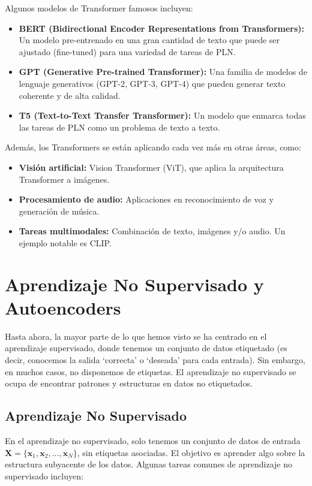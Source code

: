 \documentclass{article}
\begin{document}
Algunos modelos de Transformer famosos incluyen:

\begin{itemize}
    \item \textbf{BERT (Bidirectional Encoder Representations from Transformers):}  Un modelo pre-entrenado en una gran cantidad de texto que puede ser ajustado (fine-tuned) para una variedad de tareas de PLN.
    \item \textbf{GPT (Generative Pre-trained Transformer):}  Una familia de modelos de lenguaje generativos (GPT-2, GPT-3, GPT-4) que pueden generar texto coherente y de alta calidad.
    \item \textbf{T5 (Text-to-Text Transfer Transformer):}  Un modelo que enmarca todas las tareas de PLN como un problema de texto a texto.
\end{itemize}
Además, los Transformers se están aplicando cada vez más en otras áreas, como:

\begin{itemize}
   \item \textbf{Visión artificial:} Vision Transformer (ViT), que aplica la arquitectura Transformer a imágenes.
   \item \textbf{Procesamiento de audio:}  Aplicaciones en reconocimiento de voz y generación de música.
   \item \textbf{Tareas multimodales:}  Combinación de texto, imágenes y/o audio. Un ejemplo notable es CLIP.
\end{itemize}

\section{Aprendizaje No Supervisado y Autoencoders}

Hasta ahora, la mayor parte de lo que hemos visto se ha centrado en el aprendizaje supervisado, donde tenemos un conjunto de datos etiquetado (es decir, conocemos la salida `correcta' o `deseada' para cada entrada).  Sin embargo, en muchos casos, no disponemos de etiquetas. El aprendizaje no supervisado se ocupa de encontrar patrones y estructuras en datos no etiquetados.
\subsection{Aprendizaje No Supervisado}

En el aprendizaje no supervisado, solo tenemos un conjunto de datos de entrada \(\mathbf{X} = \{\mathbf{x}_1, \mathbf{x}_2, ..., \mathbf{x}_N\}\), sin etiquetas asociadas.  El objetivo es aprender algo sobre la estructura subyacente de los datos.  Algunas tareas comunes de aprendizaje no supervisado incluyen:
\end{document}

